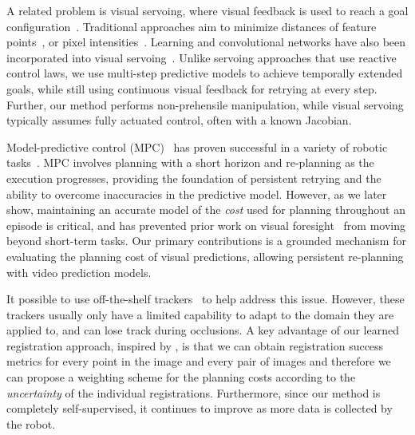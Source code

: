 A related problem is visual servoing, where visual feedback is used to reach a goal configuration~\cite{hutchinson1996tutorial,kragic2002survey,desouza2002survey}.
Traditional approaches aim to minimize distances of feature points~\cite{feddema1989vision,espiau1992servo,wilson1996relative}, or pixel intensities~\cite{caron2013photometric}. Learning and convolutional networks have also been incorporated into visual servoing~\cite{saxena2017servoing,bateux2018servoing,lee2017servoing,google_handeye}. Unlike servoing approaches that use reactive control laws, we use multi-step predictive models to achieve temporally extended goals, while still using continuous visual feedback for retrying at every step. Further, our method performs non-prehensile manipulation, while visual servoing typically assumes fully actuated control, often with a known Jacobian.

Model-predictive control (MPC)~\cite{camacho2013model} has proven successful in a variety of robotic tasks~\cite{shim2003decentralized,allibert2010predictive,howard2010receding,williams2017information,deep_mpc}.
MPC involves planning with a short horizon and re-planning as the execution progresses, providing the foundation of persistent retrying and the ability to overcome inaccuracies in the predictive model. However, as we later show, maintaining an accurate model of the \emph{cost} used for planning throughout an episode is critical, and has prevented prior work on visual foresight~\cite{foresight,sna} from moving beyond short-term tasks.
Our primary contributions is a grounded mechanism for evaluating the planning cost of visual predictions, allowing persistent re-planning with video prediction models.

It possible to use off-the-shelf trackers~\cite{lucas1981iterative,brox2004high,babenko2009visual,mei2009robust} to help address this issue. However, these trackers usually only have a limited capability to adapt to the domain they are applied to, and can lose track during occlusions. A key advantage of our learned registration approach, inspired by \cite{meister2017unflow}, is that we can obtain registration success metrics for every point in the image and every pair of images and therefore we can propose a weighting scheme for the planning costs according to the \emph{uncertainty} of the individual registrations. Furthermore, since our method is completely self-supervised, it continues to improve as more data is collected by the robot.
